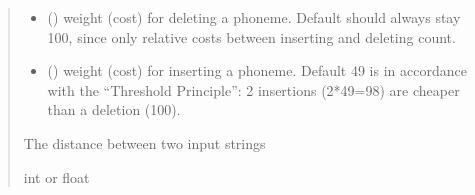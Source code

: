 \documentclass[letterpaper,10pt,english]{sphinxmanual}
\begin{document}
\begin{fulllineitems}
\begin{quote}
\begin{description}
\begin{itemize}
\item {} 
\sphinxAtStartPar
{} (\sphinxstyleliteralemphasis{\sphinxupquote{, }}) \textendash{} weight (cost) for deleting a phoneme. Default should
always stay 100, since only relative costs between inserting
and deleting count.

\item {} 
\sphinxAtStartPar
{} (\sphinxstyleliteralemphasis{\sphinxupquote{, }}) \textendash{} weight (cost) for inserting a phoneme. Default 49
is in accordance with the “Threshold Principle”:
2 insertions (2*49=98) are cheaper than a deletion (100).

\end{itemize}

\sphinxAtStartPar
The distance between two input strings

\sphinxAtStartPar
int or float

\end{description}\end{quote}

\sphinxAtStartPar
{}


\end{fulllineitems}
\end{document}
